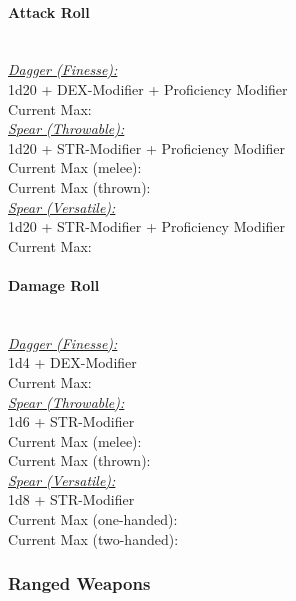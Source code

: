 \documentclass[letterpaper,openany,oneside,twocolumn]{book}
\begin{document}
\paragraph*{Attack Roll}\hfill\\
\underline{\textit{Dagger (Finesse):}}\\
1d20 + DEX-Modifier + Proficiency Modifier\\
\indent Current Max: 
\\
\underline{\textit{Spear (Throwable):}}\\
1d20 + STR-Modifier + Proficiency Modifier\\
\indent Current Max (melee): \\
\indent Current Max (thrown): 
\\
\underline{\textit{Spear (Versatile):}}\\
1d20 + STR-Modifier + Proficiency Modifier\\
\indent Current Max: 
\paragraph*{Damage Roll}\hfill\\
\underline{\textit{Dagger (Finesse):}}\\
1d4 + DEX-Modifier\\
\indent Current Max: 
\\
\underline{\textit{Spear (Throwable):}}\\
1d6 + STR-Modifier\\
\indent Current Max (melee): \\
\indent Current Max (thrown): 
\\
\underline{\textit{Spear (Versatile):}}\\
1d8 + STR-Modifier\\
\indent Current Max (one-handed): \\
\indent Current Max (two-handed): 
\subsubsection*{Ranged Weapons}
\end{document}
